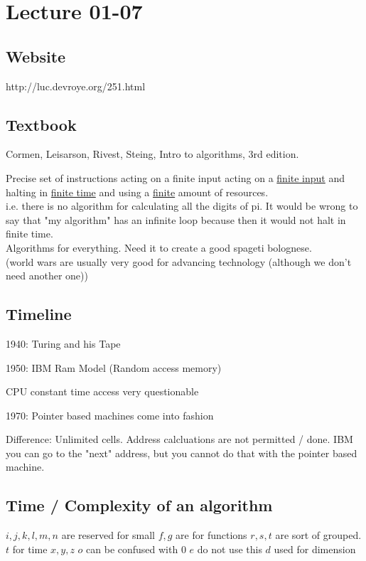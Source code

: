 \documentclass[class=scrartcl, crop=false]{standalone}
\date{2020-01-07}
\begin{document}
\section{Lecture 01-07}
\subsection{Website}
http://luc.devroye.org/251.html

\subsection{Textbook}
Cormen, Leisarson, Rivest, Steing, Intro to algorithms, 3rd edition.


\begin{definition}
  Precise set of instructions acting on a finite input acting on a \ul{finite input} and halting in \ul{finite time} and using a \ul{finite} amount of resources. 
  \\
  i.e. there is no algorithm for calculating all the digits of pi. It would be wrong to say that "my algorithm" has an infinite loop because then it would not halt in finite time.
  \\
  Algorithms for everything. Need it to create a good spageti bolognese.
  \\
  (world wars are usually very good for advancing technology (although we don't need another one))
\end{definition} 

\subsection{Timeline}

1940: Turing and his Tape

1950: IBM Ram Model (Random access memory)

CPU constant time access very questionable

1970: Pointer based machines come into fashion

Difference: Unlimited cells. Address calcluations are not permitted / done. IBM you can go to the "next" address, but you cannot do that with the pointer based machine.

\subsection{Time / Complexity of an algorithm}

\begin{note}
  $i, j, k, l, m, n$ are reserved for small 
  $f, g$ are for functions
  $r, s, t$ are sort of grouped. $t$ for time
  $x, y, z$ 
  $o$ can be confused with 0
  $e$ do not use this
  $d$ used for dimension
\end{note} 
\end{document}
